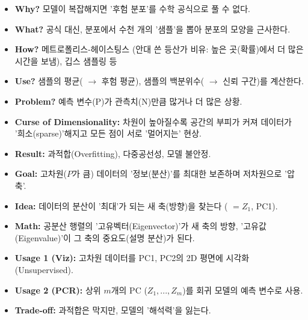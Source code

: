\documentclass[11pt,a4paper]{book}
\theoremstyle{definition}
\begin{document}
\begin{tcolorbox}[colback=blue!5!white, colframe=blue!75!black, title={베이즈 시뮬레이션 (MCMC)}]
\begin{itemize}
    \item \textbf{Why?} 모델이 복잡해지면 '후험 분포'를 수학 공식으로 풀 수 없다.
    \item \textbf{What?} 공식 대신, 분포에서 수천 개의 '샘플'을 뽑아 분포의 모양을 근사한다.
    \item \textbf{How?} 메트로폴리스-헤이스팅스 (안대 쓴 등산가 비유: 높은 곳(확률)에서 더 많은 시간을 보냄), 깁스 샘플링 등
    \item \textbf{Use?} 샘플의 평균( $\rightarrow$ 후험 평균), 샘플의 백분위수( $\rightarrow$ 신뢰 구간)를 계산한다.
\end{itemize}
\end{tcolorbox}

\begin{tcolorbox}[colback=red!5!white, colframe=red!75!black, title={고차원성의 문제 (P is Big)}]
\begin{itemize}
    \item \textbf{Problem?} 예측 변수(P)가 관측치(N)만큼 많거나 더 많은 상황.
    \item \textbf{Curse of Dimensionality:} 차원이 높아질수록 공간의 부피가 커져 데이터가 '희소(sparse)'해지고 모든 점이 서로 '멀어지는' 현상.
    \item \textbf{Result:} 과적합(Overfitting), 다중공선성, 모델 불안정.
\end{itemize}
\end{tcolorbox}

\begin{tcolorbox}[colback=green!5!white, colframe=green!75!black, title={주성분 분석 (PCA)}]
\begin{itemize}
    \item \textbf{Goal:} 고차원($P$가 큼) 데이터의 '정보(분산)'를 최대한 보존하며 저차원으로 '압축'.
    \item \textbf{Idea:} 데이터의 분산이 '최대'가 되는 새 축(방향)을 찾는다 ( $=Z_1$, PC1).
    \item \textbf{Math:} 공분산 행렬의 '고유벡터(Eigenvector)'가 새 축의 방향, '고유값(Eigenvalue)'이 그 축의 중요도(설명 분산)가 된다.
    \item \textbf{Usage 1 (Viz):} 고차원 데이터를 PC1, PC2의 2D 평면에 시각화 (Unsupervised).
    \item \textbf{Usage 2 (PCR):} 상위 $m$개의 PC ($Z_1, ..., Z_m$)를 회귀 모델의 예측 변수로 사용.
    \item \textbf{Trade-off:} 과적합은 막지만, 모델의 '해석력'을 잃는다.
\end{itemize}
\end{tcolorbox}
\end{document}
